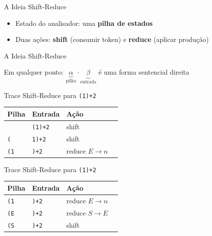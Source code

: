 \begin{frame}{A Ideia Shift-Reduce}

    \begin{itemize}

        \item
        Estado do analisador: uma \textbf{pilha de estados}
        \item
        Duas ações: \textbf{shift} (consumir token) e \textbf{reduce} (aplicar
        produção)
    \end{itemize}
\end{frame}

\begin{frame}{A Ideia Shift-Reduce}

    Em qualquer ponto:
    \(\underbrace{\alpha}_{\text{pilha}} \cdot \underbrace{\beta}_{\text{entrada}}\)
    é uma forma sentencial direita
\end{frame}

\begin{frame}[fragile]{Trace Shift-Reduce para
    \texttt{(1)+2}}

    \begin{table}
        \begin{tabular}{l l l l}
            \hline
            Pilha & Entrada & Ação \\
            \hline
            & \texttt{(1)+2} & shift \\
            \texttt{(} & \texttt{1)+2} & shift \\
            \texttt{(1} & \texttt{)+2} & reduce
            \(E \to n\) \\
            \hline
        \end{tabular}
    \end{table}
\end{frame}

\begin{frame}[fragile]{Trace Shift-Reduce para
    \texttt{(1)+2}}

    \begin{table}
        \begin{tabular}{l l l l}
            \hline
            Pilha & Entrada & Ação \\
            \hline
            \texttt{(1} & \texttt{)+2} & reduce
            \(E \to n\) \\
            \texttt{(E} & \texttt{)+2} & reduce
            \(S \to E\) \\
            \texttt{(S} & \texttt{)+2} & shift \\
            \hline
        \end{tabular}
    \end{table}
\end{frame}

